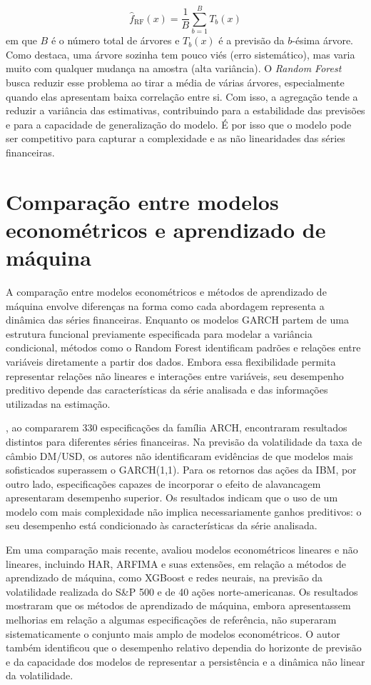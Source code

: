 \begin{equation}
    \hat{f}_{\text{RF}}(x) = \frac{1}{B} \sum_{b=1}^{B} T_b(x)
\end{equation}
em que $B$ é o número total de árvores e $T_b(x)$ é a previsão da $b$-ésima árvore. Como \textcite{amoanu2025comparative} destaca, uma árvore sozinha tem pouco viés (erro sistemático), mas varia muito com qualquer mudança 
na amostra (alta variância). O \textit{Random Forest} busca reduzir esse problema ao tirar a média de várias árvores, especialmente quando elas apresentam baixa correlação entre si. Com isso, a agregação tende a reduzir a variância das estimativas, contribuindo para a estabilidade das previsões e para a capacidade de generalização do modelo.
É por isso que o modelo pode ser competitivo para capturar a complexidade e as não linearidades das séries financeiras.
 
\section{Comparação entre modelos econométricos e aprendizado de máquina}

A comparação entre modelos econométricos e métodos de aprendizado de máquina envolve diferenças na forma como cada abordagem representa a dinâmica das séries financeiras. Enquanto os modelos GARCH partem 
de uma estrutura funcional previamente especificada para modelar a variância condicional, métodos como o Random Forest identificam padrões e relações entre variáveis diretamente a partir dos dados. Embora 
essa flexibilidade permita representar relações não lineares e interações entre variáveis, seu desempenho preditivo depende das características da série analisada e das informações utilizadas na estimação.

\textcite{hansen2005forecast}, ao compararem 330 especificações da família ARCH, encontraram resultados distintos para diferentes séries financeiras. Na previsão da volatilidade da taxa de câmbio DM/USD, os autores 
não identificaram evidências de que modelos mais sofisticados superassem o GARCH(1,1). Para os retornos das ações da IBM, por outro lado, especificações capazes de incorporar o efeito de alavancagem apresentaram 
desempenho superior. Os resultados indicam que o uso de um modelo com mais complexidade não implica necessariamente ganhos preditivos: o seu desempenho está condicionado às características da série analisada.

Em uma comparação mais recente, \textcite{kilic2026linear} avaliou modelos econométricos lineares e não lineares, incluindo HAR, ARFIMA e suas extensões, em relação a métodos de aprendizado de máquina, como XGBoost e 
redes neurais, na previsão da volatilidade realizada do S\&P 500 e de 40 ações norte-americanas. Os resultados mostraram que os métodos de aprendizado de máquina, embora apresentassem melhorias em relação 
a algumas especificações de referência, não superaram sistematicamente o conjunto mais amplo de modelos econométricos. O autor também identificou que o desempenho relativo dependia do horizonte de previsão 
e da capacidade dos modelos de representar a persistência e a dinâmica não linear da volatilidade.

